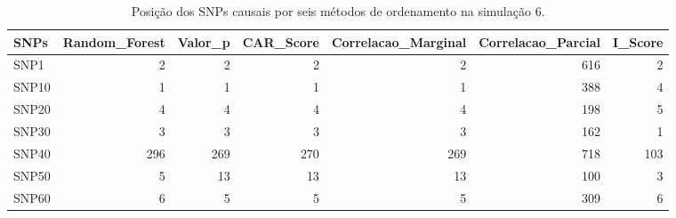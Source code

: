 \begin{table}[ht]
\centering
\begin{tabular}{lrrrrrr}
  \hline
SNPs & Random\_Forest & Valor\_p & CAR\_Score & Correlacao\_Marginal & Correlacao\_Parcial & I\_Score \\ 
  \hline
SNP1 &   2 &   2 &   2 &   2 & 616 &   2 \\ 
  SNP10 &   1 &   1 &   1 &   1 & 388 &   4 \\ 
  SNP20 &   4 &   4 &   4 &   4 & 198 &   5 \\ 
  SNP30 &   3 &   3 &   3 &   3 & 162 &   1 \\ 
  SNP40 & 296 & 269 & 270 & 269 & 718 & 103 \\ 
  SNP50 &   5 &  13 &  13 &  13 & 100 &   3 \\ 
  SNP60 &   6 &   5 &   5 &   5 & 309 &   6 \\ 
   \hline
\end{tabular}
\caption{Posição dos SNPs causais por seis métodos de ordenamento na simulação 6.} 
\label{tab:positions_causais}
\end{table}

